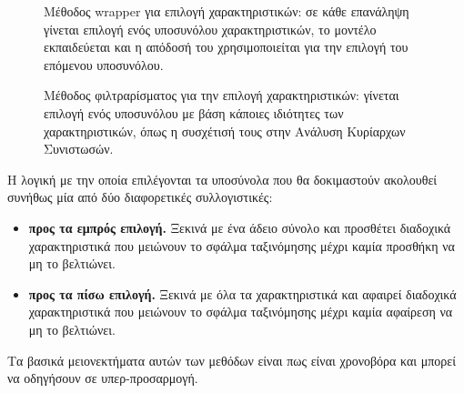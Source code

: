 \begin{figure}[!htb]
	\begin{minipage}{0.45\textwidth}
		\caption[Μέθοδος wrapper για επιλογή χαρακτηριστικών]{Μέθοδος wrapper για επιλογή χαρακτηριστικών: σε κάθε επανάληψη γίνεται επιλογή ενός υποσυνόλου χαρακτηριστικών, το μοντέλο εκπαιδεύεται και η απόδοσή του χρησιμοποιείται για την επιλογή του επόμενου υποσυνόλου.}
		\label{fig:wrapper}
	\end{minipage} \qquad
	\begin{minipage}{0.45\textwidth}
		\caption[Μέθοδος φιλτραρίσματος για την επιλογή χαρακτηριστικών]{Μέθοδος φιλτραρίσματος για την επιλογή χαρακτηριστικών: γίνεται επιλογή ενός υποσυνόλου με βάση κάποιες ιδιότητες των χαρακτηριστικών, όπως η συσχέτισή τους στην Ανάλυση Κυρίαρχων Συνιστωσών.}
	\end{minipage}
\end{figure}

Η λογική με την οποία επιλέγονται τα υποσύνολα που θα δοκιμαστούν ακολουθεί συνήθως μία από δύο διαφορετικές συλλογιστικές:
\begin{itemize}
	\item \textbf{προς τα εμπρός επιλογή.} Ξεκινά με ένα άδειο σύνολο και προσθέτει διαδοχικά χαρακτηριστικά που μειώνουν το σφάλμα ταξινόμησης μέχρι καμία προσθήκη να μη το βελτιώνει.
	\item \textbf{προς τα πίσω επιλογή.} Ξεκινά με όλα τα χαρακτηριστικά και αφαιρεί διαδοχικά χαρακτηριστικά που μειώνουν το σφάλμα ταξινόμησης μέχρι καμία αφαίρεση να μη το βελτιώνει.
\end{itemize}
Τα βασικά μειονεκτήματα αυτών των μεθόδων είναι πως είναι χρονοβόρα και μπορεί να οδηγήσουν σε υπερ-προσαρμογή.

